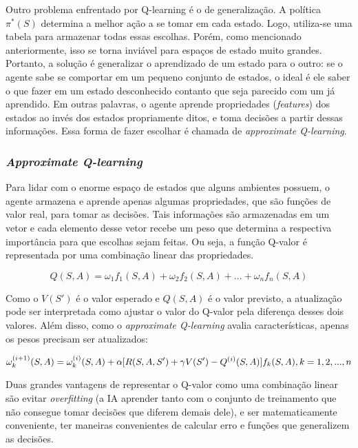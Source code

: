 Outro problema enfrentado por Q-learning é o de generalização. A política $\pi^{*}(S)$ determina a melhor ação a se tomar em cada estado. Logo, utiliza-se uma tabela para armazenar todas essas escolhas. Porém, como mencionado anteriormente, isso se torna inviável para espaços de estado muito grandes. Portanto, a solução é generalizar o aprendizado de um estado para o outro: se o agente sabe se comportar em um pequeno conjunto de estados, o ideal é ele saber o que fazer em um estado desconhecido contanto que seja parecido com um já aprendido. Em outras palavras, o agente aprende propriedades (\textit{features}) dos estados ao invés dos estados propriamente ditos, e toma decisões a partir dessas informações. Essa forma de fazer escolhar é chamada de \textit{approximate Q-learning}.

\subsubsection{\textit{Approximate Q-learning}}
\label{sec:aql}

Para lidar com o enorme espaço de estados que alguns ambientes possuem, o agente armazena e aprende apenas algumas propriedades, que são funções de valor real, para tomar as decisões. Tais informações são armazenadas em um vetor e cada elemento desse vetor recebe um peso que determina a respectiva importância para que escolhas sejam feitas. Ou seja, a função Q-valor é representada por uma combinação linear das propriedades.

\begin{equation} \label{eq:q_lin_comb}
Q(S,A) = \omega_{1}f_{1}(S,A) + \omega_{2}f_{2}(S,A) + ... + \omega_{n}f_{n}(S,A)
\end{equation}

Como o $V(S')$ é o valor esperado e $Q(S,A)$ é o valor previsto, a atualização pode ser interpretada como ajustar o valor do Q-valor pela diferença desses dois valores. Além disso, como o \textit{approximate Q-learning} avalia características, apenas os pesos precisam ser atualizados:

\begin{equation} \label{eq:w_update}
\omega_{k}^{(i+1)}(S,A) = \omega_{k}^{(i)}(S,A) + \alpha[R(S,A,S') + \gamma V(S') - Q^{(i)}(S,A)]f_{k}(S,A), \hfill k = 1, 2, ..., n
\end{equation}

Duas grandes vantagens de representar o Q-valor como uma combinação linear são evitar \textit{overfitting} (a IA aprender tanto com o conjunto de treinamento que não consegue tomar decisões que diferem demais dele), e ser matematicamente conveniente, ter maneiras convenientes de calcular erro e funções que generalizem as decisões.


